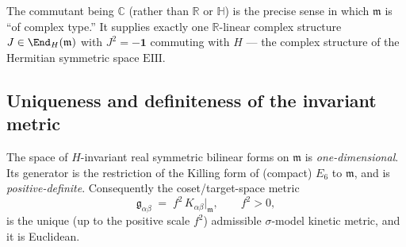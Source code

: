 The commutant being $\mathbb C$ (rather than $\mathbb R$ or
$\mathbb H$) is the precise sense in which $\mathfrak m$ is ``of complex
type.'' It supplies exactly one $\mathbb R$-linear complex structure
$J\in\End_H(\mathfrak m)$ with $J^2=-\mathbf 1$ commuting with $H$ --- the
complex structure of the Hermitian symmetric space $\mathrm{EIII}$.

\subsection{Uniqueness and definiteness of the invariant metric}
\label{sec:app-spectrum:metric}

\begin{theorem}
\label{thm:app-spectrum:metric}
The space of $H$-invariant real symmetric bilinear forms on
$\mathfrak m$ is \emph{one-dimensional}. Its generator is the restriction
of the Killing form of (compact) $E_6$ to $\mathfrak m$, and is
\emph{positive-definite}. Consequently the coset/target-space metric
\begin{equation}
  \mathfrak g_{\alpha\beta} \;=\; f^2\,K_{\alpha\beta}\big|_{\mathfrak m},
  \qquad f^2>0,
  \label{eq:app-spectrum:metric}
\end{equation}
is the unique (up to the positive scale $f^2$) admissible
$\sigma$-model kinetic metric, and it is Euclidean.
\end{theorem}

